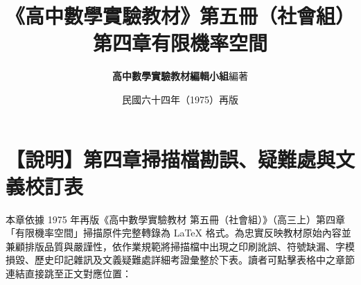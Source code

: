 \documentclass[a4paper,12pt,twoside]{article}
\title{\LARGE\textbf{《高中數學實驗教材》第五冊（社會組）}\\[0.5em] \Large\textbf{第四章\quad 有限機率空間}}
\author{\textbf{高中數學實驗教材編輯小組}\quad 編著}
\date{民國六十四年（1975）再版}
\begin{document}
\maketitle
\thispagestyle{firstpage}

\section*{【說明】第四章掃描檔勘誤、疑難處與文義校訂表}
\label{sec:errata_notes_b5_ch4}
\label{sec:current_errata}

本章依據 1975 年再版《高中數學實驗教材 第五冊（社會組）》（高三上）第四章「有限機率空間」掃描原件完整轉錄為 \LaTeX{} 格式。為忠實反映教材原始內容並兼顧排版品質與嚴謹性，依作業規範將掃描檔中出現之印刷訛誤、符號缺漏、字模損毀、歷史印記雜訊及文義疑難處詳細考證彙整於下表。讀者可點擊表格中之章節連結直接跳至正文對應位置：
\end{document}
